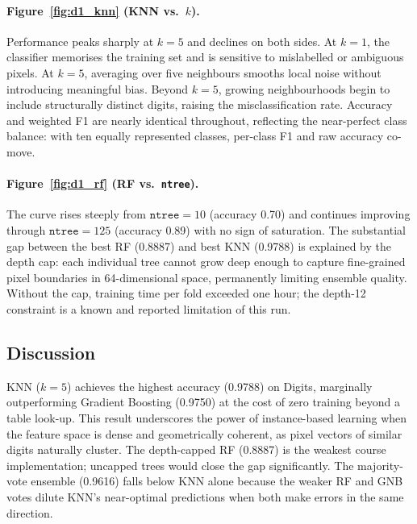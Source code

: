 \documentclass[11pt,letterpaper]{article}
\begin{document}
\paragraph{Figure~\ref{fig:d1_knn} (KNN vs.\ $k$).}
Performance peaks sharply at $k=5$ and declines on both sides.  At $k=1$,
the classifier memorises the training set and is sensitive to mislabelled or
ambiguous pixels.  At $k=5$, averaging over five neighbours smooths local
noise without introducing meaningful bias.  Beyond $k=5$, growing
neighbourhoods begin to include structurally distinct digits, raising
the misclassification rate.  Accuracy and weighted F1 are nearly
identical throughout, reflecting the near-perfect class balance: with
ten equally represented classes, per-class F1 and raw accuracy co-move.

\paragraph{Figure~\ref{fig:d1_rf} (RF vs.\ \texttt{ntree}).}
The curve rises steeply from $\texttt{ntree}=10$ (accuracy 0.70) and
continues improving through $\texttt{ntree}=125$ (accuracy 0.89) with no
sign of saturation.  The substantial gap between the best RF (0.8887) and
best KNN (0.9788) is explained by the depth cap: each individual tree
cannot grow deep enough to capture fine-grained pixel boundaries in
64-dimensional space, permanently limiting ensemble quality.  Without the cap,
training time per fold exceeded one hour; the depth-12 constraint is a known
and reported limitation of this run.

\subsection{Discussion}

KNN ($k=5$) achieves the highest accuracy (0.9788) on Digits, marginally
outperforming Gradient Boosting (0.9750) at the cost of zero training beyond
a table look-up.  This result underscores the power of instance-based learning
when the feature space is dense and geometrically coherent, as pixel vectors
of similar digits naturally cluster.  The depth-capped RF (0.8887) is the
weakest course implementation; uncapped trees would close the gap
significantly.  The majority-vote ensemble (0.9616) falls below KNN alone
because the weaker RF and GNB votes dilute KNN's near-optimal predictions
when both make errors in the same direction.

\end{document}
